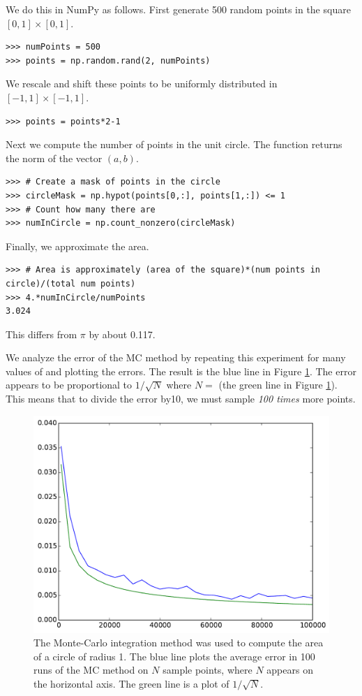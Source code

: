 We do this in NumPy as follows. First generate 500 random points in the square $[0,1] \times [0,1]$.
\begin{lstlisting}
>>> numPoints = 500
>>> points = np.random.rand(2, numPoints)
\end{lstlisting}
We rescale and shift these points to be uniformly distributed in $[-1,1]\times[-1,1]$.
\begin{lstlisting}
>>> points = points*2-1
\end{lstlisting}
Next we compute the number of points in the unit circle.
The function  returns the norm of the vector $(a, b)$.
\begin{lstlisting}
>>> # Create a mask of points in the circle
>>> circleMask = np.hypot(points[0,:], points[1,:]) <= 1
>>> # Count how many there are
>>> numInCircle = np.count_nonzero(circleMask)
\end{lstlisting}
Finally, we approximate the area.
\begin{lstlisting}
>>> # Area is approximately (area of the square)*(num points in circle)/(total num points)
>>> 4.*numInCircle/numPoints
3.024
\end{lstlisting}
This differs from $\pi$ by about 0.117.






We analyze the error of the MC method by repeating this experiment for many values of  and plotting the errors.
The result is the blue line in Figure \ref{fig:mc_error}.
The error appears to be proportional to $1/\sqrt{N}$ where $N=$ (the green line in Figure \ref{fig:mc_error}).
This means that to divide the error by10, we must sample \emph{100 times} more points.

\begin{figure}
\includegraphics[width=.7\textwidth]{mc_error.pdf}
\caption{The Monte-Carlo integration method was used to compute the area of a circle of radius 1. 
The blue line plots the average error in 100 runs of the MC method on $N$ sample points, where $N$ appears on the horizontal axis.
The green line is a plot of $1/\sqrt{N}$. }
\label{fig:mc_error}
\end{figure}


